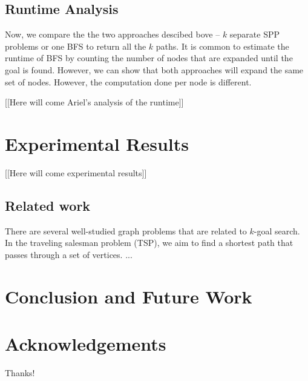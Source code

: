 \documentclass{aicom2e}
\begin{document}
\subsection{Runtime Analysis}
Now, we compare the the two approaches descibed bove -- $k$ separate SPP problems or one BFS to return all the $k$ paths. 
It is common to estimate the runtime of BFS by counting the number of nodes that are expanded until the goal is found. However, we can show that both approaches will expand the same set of nodes.  However, the computation done per node is different. 

[[Here will come Ariel's analysis of the runtime]]




\section{Experimental Results}
[[Here will come experimental results]]

\subsection*{Related work}

There are several well-studied graph problems that are related to $k$-goal search. In the traveling salesman problem (TSP), we aim to find a shortest path that passes through a set of vertices. 
...

\section{Conclusion and Future Work}


\section*{Acknowledgements}
Thanks!



\end{document}
